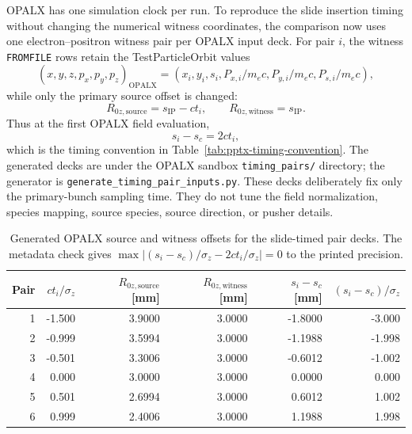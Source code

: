 \documentclass[11pt]{article}
\begin{document}
OPALX has one simulation clock per run.  To reproduce the slide insertion
timing without changing the numerical witness coordinates, the comparison now
uses one electron--positron witness pair per OPALX input deck.  For pair \(i\),
the witness \texttt{FROMFILE} rows retain the TestParticleOrbit values
\[
  (x,y,z,p_x,p_y,p_z)_{\mathrm{OPALX}}
  =
  (x_i,y_i,s_i,P_{x,i}/m_ec,P_{y,i}/m_ec,P_{s,i}/m_ec),
\]
while only the primary source offset is changed:
\[
  R_{0z,\mathrm{source}} = s_{\mathrm{IP}} - ct_i,
  \qquad
  R_{0z,\mathrm{witness}} = s_{\mathrm{IP}}.
\]
Thus at the first OPALX field evaluation,
\[
  s_i - s_c = 2ct_i,
\]
which is the timing convention in Table~\ref{tab:pptx-timing-convention}.
The generated decks are under the OPALX sandbox
\texttt{timing\_pairs/} directory; the generator is
\texttt{generate\_timing\_pair\_inputs.py}.  These decks deliberately fix only
the primary-bunch sampling time.  They do not tune the field normalization,
species mapping, source species, source direction, or pusher details.

\begin{table}[htbp]
  \centering
  \begin{tabular}{rrrrrr}
    \hline
    Pair & \(ct_i/\sigma_z\)
    & \(R_{0z,\mathrm{source}}\) [\si{mm}]
    & \(R_{0z,\mathrm{witness}}\) [\si{mm}]
    & \(s_i-s_c\) [\si{mm}]
    & \((s_i-s_c)/\sigma_z\) \\
    \hline
    1 & -1.500 & 3.9000 & 3.0000 & -1.8000 & -3.000 \\
    2 & -0.999 & 3.5994 & 3.0000 & -1.1988 & -1.998 \\
    3 & -0.501 & 3.3006 & 3.0000 & -0.6012 & -1.002 \\
    4 &  0.000 & 3.0000 & 3.0000 &  0.0000 &  0.000 \\
    5 &  0.501 & 2.6994 & 3.0000 &  0.6012 &  1.002 \\
    6 &  0.999 & 2.4006 & 3.0000 &  1.1988 &  1.998 \\
    \hline
  \end{tabular}
  \caption{Generated OPALX source and witness offsets for the slide-timed
  pair decks.  The metadata check gives
  \(\max |(s_i-s_c)/\sigma_z - 2ct_i/\sigma_z|=0\) to the printed precision.}
  \label{tab:opalx-slide-timed-generated-offsets}
\end{table}
\end{document}
